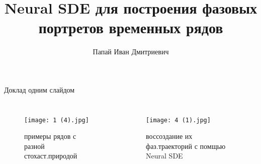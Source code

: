 \documentclass{beamer}
\title[\hbox to 56mm{Neural SDE}]{Neural SDE для построения фазовых портретов временных рядов}
\author[И.\,Д. Папай]{Папай Иван Дмитриевич}
\institute{Московский физико-технический институт}
\date{\footnotesize
\par\smallskip\emph{Курс:} Автоматизация научных исследований\par (практика, В.\,В.~Стрижов)/Группа 128б
\par\smallskip\emph{Эксперт:} В.\,В.~Стрижов
\par\smallskip\emph{Консультант:} Э.\,А.~Владимиров
\par\bigskip\small 2024}
\begin{document}
\begin{frame}
\thispagestyle{empty}
\maketitle
\end{frame}
\begin{frame}{Доклад одним слайдом}

\begin{columns}[c]
\begin{figure}
\texttt{[image: 1 (4).jpg]}
    \caption{примеры рядов с разной стохаст.природой}
\end{figure}
\begin{figure}
\texttt{[image: 4 (1).jpg]}
    \caption{воссоздание их фаз.траекторий с помщью Neural SDE}
    \end{figure}
\end{columns}

\end{frame}
\end{document}
